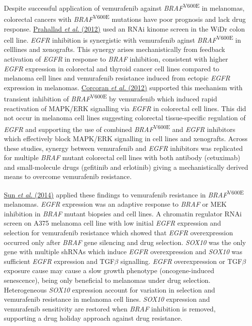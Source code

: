 Despite successful application of vemurafenib against \textit{BRAF}\textsuperscript{V600E} in melanomas, colorectal cancers with \textit{BRAF}\textsuperscript{V600E} mutations have poor prognosis and lack drug response. \hyperlink{ENREF80}{Prahallad}\hyperlink{ENREF80}{\textit{ et al.}}\hyperlink{ENREF80}{ (2012)} used an RNAi kinome screen in the WiDr colon cell line. \textit{EGFR} inhibition is synergistic with vemurafenib aginst \textit{BRAF}\textsuperscript{V600E} in celllines and xenografts. This synergy arises mechanistically from feedback activation of \textit{EGFR} in response to \textit{BRAF} inhibition, consistent with higher \textit{EGFR} expression in colorectal and thyroid cancer cell lines compared to melanoma cell lines and vemurafenib resistance induced from ectopic \textit{EGFR} expression in melanomas. \hyperlink{ENREF24}{Corcoran}\hyperlink{ENREF24}{\textit{ et al.}}\hyperlink{ENREF24}{ (2012)} supported this mechanism with transient inhibition of \textit{BRAF}\textsuperscript{V600E} by vemurafenib which induced rapid reactivation of MAPK/ERK signalling via \textit{EGFR} in colorectal cell lines. This did not occur in melanoma cell lines suggesting colorectal tissue-specific regulation of \textit{EGFR} and supporting the use of combined \textit{BRAF}\textsuperscript{V600E} and \textit{EGFR} inhibitors which effectively block MAPK/ERK signalling in cell lines and xenografts. Across these studies, synergy between vemurafenib and \textit{EGFR} inhibitors was replicated for multiple \textit{BRAF} mutant colorectal cell lines with both antibody (cetuximab) and small-molecule drugs (gefitinib and erlotinib) giving a mechanistically derived means to overcome vemurafenib resistance.  

\hyperlink{ENREF92}{Sun}\hyperlink{ENREF92}{\textit{ et al.}}\hyperlink{ENREF92}{ (2014)} applied these findings to vemurafenib resistance in \textit{BRAF}\textsuperscript{V600E} melanomas. \textit{EGFR} expression was an adaptive response to \textit{BRAF} or MEK inhibition in \textit{BRAF} mutant biopsies and cell lines. A chromatin regulator RNAi screen on A375 melanoma cell line with low initial \textit{EGFR} expression and selection for vemurafenib resistance which showed that \textit{EGFR} overexpression occurred only after \textit{BRAF} gene silencing and drug selection. \textit{SOX10} was the only gene with multiple shRNAs which induce \textit{EGFR} overexpression and \textit{SOX10} was sufficient \textit{EGFR} expression and TGF$\beta $ signalling. \textit{EGFR} overexpression or TGF$\beta$ exposure cause may cause a slow growth phenotype (oncogene-induced senescence), being only beneficial to melanomas under drug selection. Heterogeneous \textit{SOX10} expression account for variation in selection and vemurafenib resistance in melanoma cell lines. \textit{SOX10} expression and vemurafenib sensitivity are restored when \textit{BRAF} inhibition is removed, supporting a drug holiday approach against drug resistance.  

